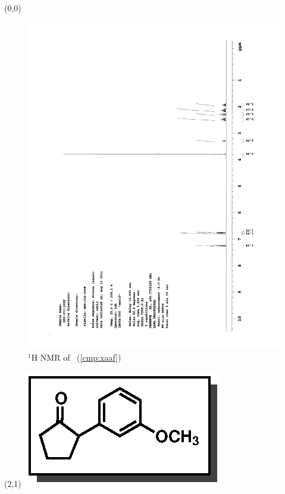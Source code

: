 \begin{textblock}{20}(0,0)
\begin{figure}[htb]
\caption{$^1$H NMR of \CMPxaaf\ (\ref{cmp:xaaf})}
\includegraphics[scale=0.75, trim = 0mm 0mm 0mm 5mm,
clip]{chp_asymmetric/images/nmr/xaafH}
\vspace{-100pt}
\end{figure}
\end{textblock}
\begin{textblock}{1}(2,1)
\includegraphics[scale=0.8, angle=90]{chp_asymmetric/images/xaaf}
\end{textblock}
